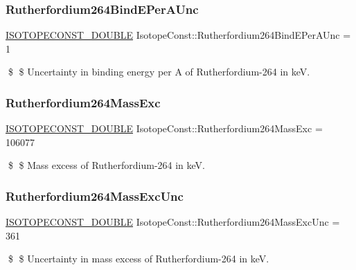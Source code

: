 \subsubsection{\texorpdfstring{Rutherfordium264\+Bind\+E\+Per\+A\+Unc}{Rutherfordium264BindEPerAUnc}}
{\footnotesize\ttfamily \mbox{\hyperlink{group___isotope_const-_macros_ga8f45a7272ce02c0b4c65c44636ed719a}{I\+S\+O\+T\+O\+P\+E\+C\+O\+N\+S\+T\+\_\+\+D\+O\+U\+B\+LE}} Isotope\+Const\+::\+Rutherfordium264\+Bind\+E\+Per\+A\+Unc = 1}

\$ \$ Uncertainty in binding energy per A of Rutherfordium-\/264 in keV. \mbox{\label{group___isotope_const-_rutherfordium-_rf264_ga58817ec6354c80f1c715cc959ce8c06c}} 
\subsubsection{\texorpdfstring{Rutherfordium264\+Mass\+Exc}{Rutherfordium264MassExc}}
{\footnotesize\ttfamily \mbox{\hyperlink{group___isotope_const-_macros_ga8f45a7272ce02c0b4c65c44636ed719a}{I\+S\+O\+T\+O\+P\+E\+C\+O\+N\+S\+T\+\_\+\+D\+O\+U\+B\+LE}} Isotope\+Const\+::\+Rutherfordium264\+Mass\+Exc = 106077}

\$ \$ Mass excess of Rutherfordium-\/264 in keV. \mbox{\label{group___isotope_const-_rutherfordium-_rf264_gad40d2988f7acd8ca52760d3e031ef90a}} 
\subsubsection{\texorpdfstring{Rutherfordium264\+Mass\+Exc\+Unc}{Rutherfordium264MassExcUnc}}
{\footnotesize\ttfamily \mbox{\hyperlink{group___isotope_const-_macros_ga8f45a7272ce02c0b4c65c44636ed719a}{I\+S\+O\+T\+O\+P\+E\+C\+O\+N\+S\+T\+\_\+\+D\+O\+U\+B\+LE}} Isotope\+Const\+::\+Rutherfordium264\+Mass\+Exc\+Unc = 361}

\$ \$ Uncertainty in mass excess of Rutherfordium-\/264 in keV. \mbox{\label{group___isotope_const-_rutherfordium-_rf264_ga3d5b19ca2e647551c604246e7a18a97c}} 
